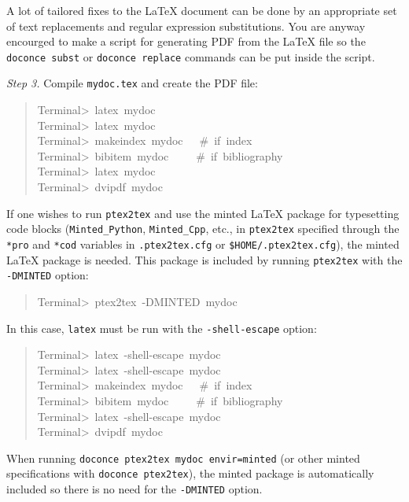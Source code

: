 \documentclass[a4paper]{article}
\begin{document}
A lot of tailored fixes to the LaTeX document can be done by
an appropriate set of text replacements and regular expression
substitutions. You are anyway encourged to make a script for
generating PDF from the LaTeX file so the \texttt{doconce subst} or
\texttt{doconce replace} commands can be put inside the script.

\emph{Step 3.} Compile \texttt{mydoc.tex}
and create the PDF file:
%
\begin{quote}{\ttfamily \raggedright \noindent
Terminal>~latex~mydoc\\
Terminal>~latex~mydoc\\
Terminal>~makeindex~mydoc~~~\#~if~index\\
Terminal>~bibitem~mydoc~~~~~\#~if~bibliography\\
Terminal>~latex~mydoc\\
Terminal>~dvipdf~mydoc
}
\end{quote}

If one wishes to run \texttt{ptex2tex} and use the minted LaTeX package for
typesetting code blocks (\texttt{Minted\_Python}, \texttt{Minted\_Cpp}, etc., in
\texttt{ptex2tex} specified through the \texttt{*pro} and \texttt{*cod} variables in
\texttt{.ptex2tex.cfg} or \texttt{\$HOME/.ptex2tex.cfg}), the minted LaTeX package is
needed.  This package is included by running \texttt{ptex2tex} with the
\texttt{-DMINTED} option:
%
\begin{quote}{\ttfamily \raggedright \noindent
Terminal>~ptex2tex~-DMINTED~mydoc
}
\end{quote}

In this case, \texttt{latex} must be run with the
\texttt{-shell-escape} option:
%
\begin{quote}{\ttfamily \raggedright \noindent
Terminal>~latex~-shell-escape~mydoc\\
Terminal>~latex~-shell-escape~mydoc\\
Terminal>~makeindex~mydoc~~~\#~if~index\\
Terminal>~bibitem~mydoc~~~~~\#~if~bibliography\\
Terminal>~latex~-shell-escape~mydoc\\
Terminal>~dvipdf~mydoc
}
\end{quote}

When running \texttt{doconce ptex2tex mydoc envir=minted} (or other minted
specifications with \texttt{doconce ptex2tex}), the minted package is automatically
included so there is no need for the \texttt{-DMINTED} option.


\end{document}
